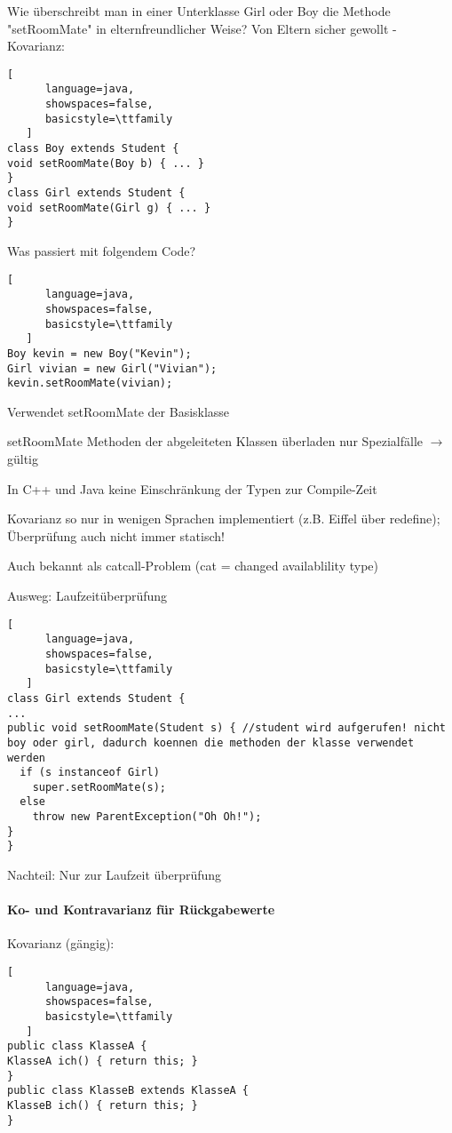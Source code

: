 \documentclass[10pt]{article}
\begin{document}
\begin{itemize*}
Wie überschreibt man in einer Unterklasse Girl oder Boy die Methode "setRoomMate" in elternfreundlicher Weise? Von Eltern sicher gewollt - Kovarianz:
\begin{lstlisting}[
      language=java,
      showspaces=false,
      basicstyle=\ttfamily
   ]
class Boy extends Student {
void setRoomMate(Boy b) { ... }
}
class Girl extends Student {
void setRoomMate(Girl g) { ... }
}
\end{lstlisting}

Was passiert mit folgendem Code?
\begin{lstlisting}[
      language=java,
      showspaces=false,
      basicstyle=\ttfamily
   ]
Boy kevin = new Boy("Kevin");
Girl vivian = new Girl("Vivian");
kevin.setRoomMate(vivian);
\end{lstlisting}

\begin{itemize*}
  \item Verwendet setRoomMate der Basisklasse
  \item setRoomMate Methoden der abgeleiteten Klassen überladen nur Spezialfälle $\rightarrow$ gültig
  
  \item In C++ und Java keine Einschränkung der Typen zur Compile-Zeit
  \item Kovarianz so nur in wenigen Sprachen implementiert (z.B. Eiffel über redefine); Überprüfung auch nicht immer statisch!
  \item Auch bekannt als catcall-Problem (cat = changed availablility type)
\end{itemize*}
Ausweg: Laufzeitüberprüfung
\begin{lstlisting}[
      language=java,
      showspaces=false,
      basicstyle=\ttfamily
   ]
class Girl extends Student {
...
public void setRoomMate(Student s) { //student wird aufgerufen! nicht boy oder girl, dadurch koennen die methoden der klasse verwendet werden
  if (s instanceof Girl)
    super.setRoomMate(s);
  else
    throw new ParentException("Oh Oh!");
}
}
\end{lstlisting}

Nachteil: Nur zur Laufzeit überprüfung

\paragraph{Ko- und Kontravarianz für Rückgabewerte}
Kovarianz (gängig):
\begin{lstlisting}[
      language=java,
      showspaces=false,
      basicstyle=\ttfamily
   ]
public class KlasseA {
KlasseA ich() { return this; }
}
public class KlasseB extends KlasseA {
KlasseB ich() { return this; }
}
\end{lstlisting}


\end{itemize*}
\end{document}
